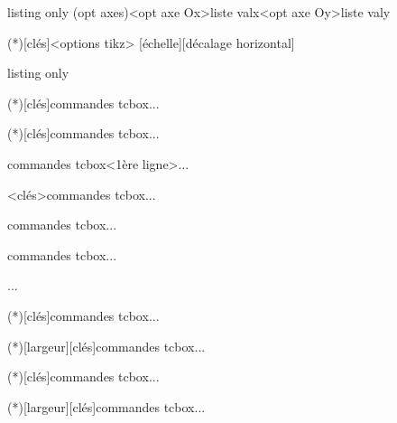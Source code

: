 \documentclass[a4paper,french,11pt]{article}
\begin{document}
\begin{PresCodeTexPL}{listing only}
\AxesTikz[options]  
\FenetreSimpleTikz[options](opt axes)<opt axe Ox>{liste valx}<opt axe Oy>{liste valy}


\MiniSchemaSignes(*)[clés]<options tikz>
[échelle][décalage horizontal]

\end{PresCodeTexPL}

\begin{PresCodeTexPL}{listing only}
\begin{CodePythonLst}(*)[clés]{commandes tcbox}...\end{CodePythonLst}
\begin{CodePythonLstAlt}(*)[clés]{commandes tcbox}...\end{CodePythonLstAlt}
\begin{CodePiton}{commandes tcbox}<1ère ligne>...\end{CodePiton}
\begin{PitonConsole}<clés>{commandes tcbox}...\end{PitonConsole}
\begin{CodePythontex}[clés]{commandes tcbox}...\end{CodePythontex}
\begin{CodePythontexAlt}[clés]{commandes tcbox}...\end{CodePythontexAlt}
\begin{ConsolePythontex}[options]{}...\end{ConsolePythontex}
\begin{CodePythonMinted}(*)[clés]{commandes tcbox}...\end{CodePythonMinted}
\begin{CodePythonMintedAlt}(*)[largeur][clés]{commandes tcbox}...\end{CodePythonMintedAlt}

\begin{PseudoCode}(*)[clés]{commandes tcbox}...\end{PseudoCode}
\begin{PseudoCodeAlt}(*)[largeur][clés]{commandes tcbox}...\end{PseudoCodeAlt}
\end{PresCodeTexPL}
\end{document}
